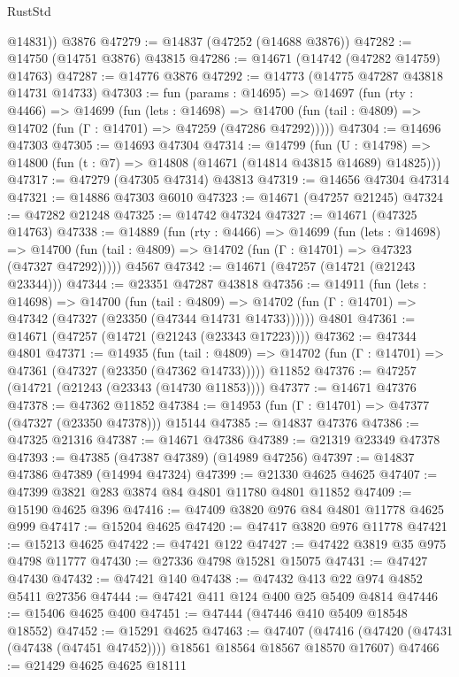 \begin{lexlean}{RustStd}
\begin{coremodule}
        @14831))
    @3876
@47279 := @14837 (@47252 (@14688 @3876))
@47282 := @14750 (@14751 @3876) @43815
@47286 := @14671 (@14742 (@47282 @14759) @14763)
@47287 := @14776 @3876
@47292 := @14773 (@14775 @47287 @43818 @14731 @14733)
@47303 := fun (params : @14695) =>
  @14697
    (fun (rty : @4466) =>
    @14699
      (fun (lets : @14698) =>
      @14700 (fun (tail : @4809) => @14702 (fun (Γ : @14701) => @47259 (@47286 @47292)))))
@47304 := @14696 @47303
@47305 := @14693 @47304
@47314 := @14799
    (fun (U : @14798) => @14800 (fun (t : @7) => @14808 (@14671 (@14814 @43815 @14689) @14825)))
@47317 := @47279 (@47305 @47314) @43813
@47319 := @14656 @47304 @47314
@47321 := @14886 @47303 @6010
@47323 := @14671 (@47257 @21245)
@47324 := @47282 @21248
@47325 := @14742 @47324
@47327 := @14671 (@47325 @14763)
@47338 := @14889
    (fun (rty : @4466) =>
    @14699
      (fun (lets : @14698) =>
      @14700 (fun (tail : @4809) => @14702 (fun (Γ : @14701) => @47323 (@47327 @47292)))))
    @4567
@47342 := @14671 (@47257 (@14721 (@21243 @23344)))
@47344 := @23351 @47287 @43818
@47356 := @14911
    (fun (lets : @14698) =>
    @14700
      (fun (tail : @4809) =>
      @14702 (fun (Γ : @14701) => @47342 (@47327 (@23350 (@47344 @14731 @14733))))))
    @4801
@47361 := @14671 (@47257 (@14721 (@21243 (@23343 @17223))))
@47362 := @47344 @4801
@47371 := @14935
    (fun (tail : @4809) => @14702 (fun (Γ : @14701) => @47361 (@47327 (@23350 (@47362 @14733)))))
    @11852
@47376 := @47257 (@14721 (@21243 (@23343 (@14730 @11853))))
@47377 := @14671 @47376
@47378 := @47362 @11852
@47384 := @14953 (fun (Γ : @14701) => @47377 (@47327 (@23350 @47378))) @15144
@47385 := @14837 @47376
@47386 := @47325 @21316
@47387 := @14671 @47386
@47389 := @21319 @23349 @47378
@47393 := @47385 (@47387 @47389) (@14989 @47256)
@47397 := @14837 @47386 @47389 (@14994 @47324)
@47399 := @21330 @4625 @4625
@47407 := @47399 @3821 @283 @3874 @84 @4801 @11780 @4801 @11852
@47409 := @15190 @4625 @396
@47416 := @47409 @3820 @976 @84 @4801 @11778 @4625 @999
@47417 := @15204 @4625
@47420 := @47417 @3820 @976 @11778
@47421 := @15213 @4625
@47422 := @47421 @122
@47427 := @47422 @3819 @35 @975 @4798 @11777
@47430 := @27336 @4798 @15281 @15075
@47431 := @47427 @47430
@47432 := @47421 @140
@47438 := @47432 @413 @22 @974 @4852 @5411 @27356
@47444 := @47421 @411 @124 @400 @25 @5409 @4814
@47446 := @15406 @4625 @400
@47451 := @47444 (@47446 @410 @5409 @18548 @18552)
@47452 := @15291 @4625
@47463 := @47407
    (@47416 (@47420 (@47431 (@47438 (@47451 @47452)))) @18561 @18564 @18567 @18570 @17607)
@47466 := @21429 @4625 @4625 @18111

\end{coremodule}
\end{lexlean}
